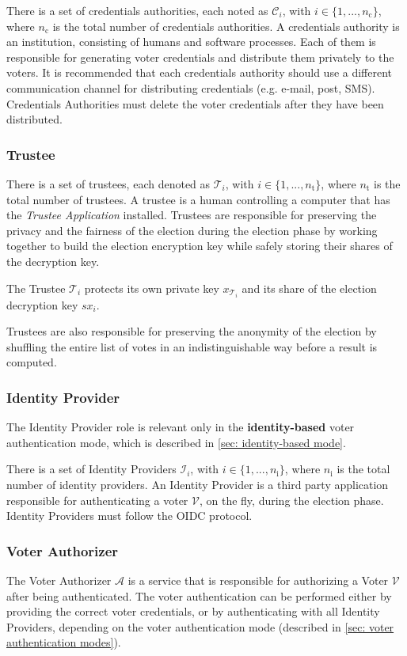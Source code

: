 There is a set of credentials authorities, each noted as $\mathcal{C}_i$, with $i \in \{ 1, ..., n_\mathrm{c} \}$, where $n_\mathrm{c}$ is the total number of credentials authorities. A credentials authority is an institution, consisting of humans and software processes. Each of them is responsible for generating voter credentials and distribute them privately to the voters. It is recommended that each credentials authority should use a different communication channel for distributing credentials (e.g. e-mail, post, SMS). Credentials Authorities must delete the voter credentials after they have been distributed.


\subsubsection{Trustee}
There is a set of trustees, each denoted as $\mathcal{T}_i$, with $i \in \{ 1, ..., n_\mathrm{t} \}$, where $n_\mathrm{t}$ is the total number of trustees. A trustee is a human controlling a computer that has the \textit{Trustee Application} installed. Trustees are responsible for preserving the privacy and the fairness of the election during the election phase by working together to build the election encryption key while safely storing their shares of the decryption key.

The Trustee $\mathcal{T}_i$ protects its own private key $x_{\mathcal{T}_i}$ and its share of the election decryption key $sx_i$.

Trustees are also responsible for preserving the anonymity of the election by shuffling the entire list of votes in an indistinguishable way before a result is computed.


\subsubsection{Identity Provider}
The Identity Provider role is relevant only in the \textbf{identity-based} voter authentication mode, which is described in \cref{sec: identity-based mode}.
    
There is a set of Identity Providers $\mathcal{I}_i$, with $i \in \{ 1, ..., n_\mathrm{i} \}$, where $n_\mathrm{i}$ is the total number of identity providers. An Identity Provider is a third party application responsible for authenticating a voter $\mathcal{V}$, on the fly, during the election phase. Identity Providers must follow the OIDC protocol.


\subsubsection{Voter Authorizer} 
The Voter Authorizer $\mathcal{A}$ is a service that is responsible for authorizing a Voter $\mathcal{V}$ after being authenticated. The voter authentication can be performed either by providing the correct voter credentials, or by authenticating with all Identity Providers, depending on the voter authentication mode (described in \cref{sec: voter authentication modes}).

